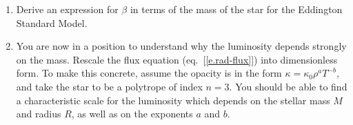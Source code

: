 \begin{enumerate}
\item Derive an expression for $\beta$ in terms of the mass of the star for the Eddington Standard Model.

\item You are now in a position to understand why the luminosity depends strongly on the mass. Rescale the flux equation (eq.~[\ref{e.rad-flux}]) into dimensionless form.  To make this concrete, assume the opacity is in the form $\kappa = \kappa_{0} \rho^{a} T^{-b}$, and take the star to be a polytrope of index $n=3$. You should be able to find a characteristic scale for the luminosity which depends on the stellar mass $M$ and radius $R$, as well as on the exponents $a$ and $b$.

\end{enumerate}
